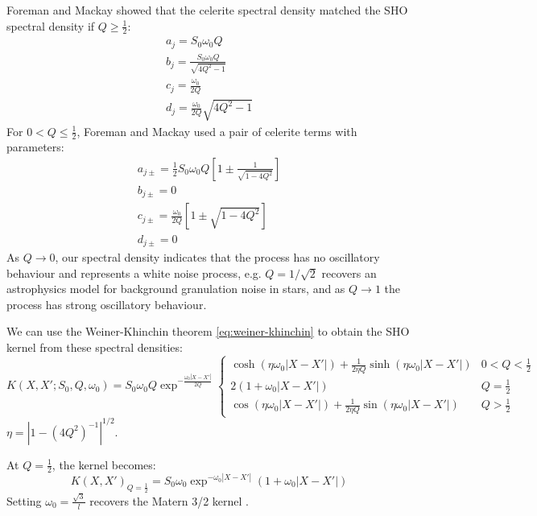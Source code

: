 Foreman and Mackay \cite{foreman-mackay} showed that the celerite spectral density matched the SHO spectral density if $Q \geq \frac{1}{2}$:
\begin{equation*}
    \begin{aligned}
        a_j = S_0 \omega_0 Q \\
        b_j = \frac{S_0 \omega_0 Q}{\sqrt{4Q^2 - 1}} \\
        c_j = \frac{\omega_0}{2Q} \\
        d_j = \frac{\omega_0}{2Q} \sqrt{4Q^2 - 1}
    \end{aligned}
\end{equation*}
For $0 < Q \leq \frac{1}{2}$, Foreman and Mackay \cite{foreman-mackay} used a pair of celerite terms with parameters:
\begin{equation*}
    \begin{aligned}
        a_{j \pm} = \frac{1}{2} S_0 \omega_0 Q \left[ 1 \pm \frac{1}{\sqrt{1 - 4Q^2}} \right] \\
        b_{j \pm} = 0 \\
        c_{j \pm} = \frac{\omega_0}{2Q} \left[ 1 \pm \sqrt{1 - 4Q^2} \right] \\
        d_{j \pm} = 0
    \end{aligned}
\end{equation*}
As $Q \to 0$, our spectral density indicates that the process has no oscillatory behaviour and represents a white noise process, e.g. $Q = 1 / \sqrt{2}$ recovers an astrophysics model \cite{sho-noise-astro} for background granulation noise in stars, and as $Q \to 1$ the process has strong oscillatory behaviour.

We can use the Weiner-Khinchin theorem \ref{eq:weiner-khinchin} to obtain the SHO kernel from these spectral densities:
\begin{equation*}
    K(X, X'; S_0, Q, \omega_0) = S_0 \omega_0 Q \exp^{-\frac{\omega_0 |X - X'|}{2Q}} \begin{cases}
            \cosh (\eta \omega_0 |X - X'|) + \frac{1}{2 \eta Q} \sinh ( \eta \omega_0 |X - X'|) & 0 < Q < \frac{1}{2} \\
            2(1 + \omega_0 |X - X'|) & Q = \frac{1}{2} \\
            \cos (\eta \omega_0 |X - X'|) + \frac{1}{2 \eta Q} \sin ( \eta \omega_0 |X - X'|) & Q > \frac{1}{2}
    \end{cases}
\end{equation*}
$\eta = |1 - (4Q^2)^{-1} |^{1/2}$. 

At $Q = \frac{1}{2}$, the kernel becomes:
\begin{equation*}
    K(X, X')_{Q = \frac{1}{2}} = S_0 \omega_0 \exp^{- \omega_0 |X - X'|} \left( 1 + \omega_0 |X - X'| \right)
\end{equation*}
Setting $\omega_0 = \frac{\sqrt{3}}{l}$ recovers the Matern 3/2 kernel \label{eq:matern-32}.

